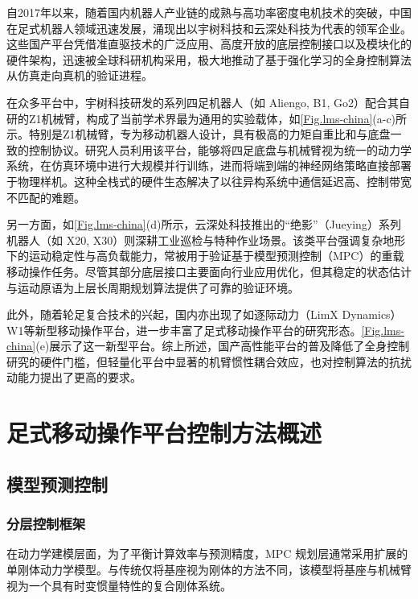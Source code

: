 自2017年以来，随着国内机器人产业链的成熟与高功率密度电机技术的突破，中国在足式机器人领域迅速发展，涌现出以宇树科技和云深处科技为代表的领军企业。这些国产平台凭借准直驱技术的广泛应用、高度开放的底层控制接口以及模块化的硬件架构，迅速被全球科研机构采用，极大地推动了基于强化学习的全身控制算法从仿真走向真机的验证进程。

在众多平台中，宇树科技研发的系列四足机器人（如 Aliengo, B1, Go2）配合其自研的Z1机械臂，构成了当前学术界最为通用的实验载体，如\autoref{Fig.lms-china}(a-c)所示。特别是Z1机械臂，专为移动机器人设计，具有极高的力矩自重比和与底盘一致的控制协议。研究人员利用该平台，能够将四足底盘与机械臂视为统一的动力学系统，在仿真环境中进行大规模并行训练，进而将端到端的神经网络策略直接部署于物理样机\cite{fu2022coupling, ji2022concurrent}。这种全栈式的硬件生态解决了以往异构系统中通信延迟高、控制带宽不匹配的难题。

另一方面，如\autoref{Fig.lms-china}(d)所示，云深处科技推出的“绝影”（Jueying）系列机器人（如 X20, X30）则深耕工业巡检与特种作业场景。该类平台强调复杂地形下的运动稳定性与高负载能力，常被用于验证基于模型预测控制（MPC）的重载移动操作任务。尽管其部分底层接口主要面向行业应用优化，但其稳定的状态估计与运动原语为上层长周期规划算法提供了可靠的验证环境\cite{wang2021model}。

此外，随着轮足复合技术的兴起，国内亦出现了如逐际动力（LimX Dynamics）W1等新型移动操作平台\cite{Jiang_2025}，进一步丰富了足式移动操作平台的研究形态。\autoref{Fig.lms-china}(e)展示了这一新型平台。综上所述，国产高性能平台的普及降低了全身控制研究的硬件门槛，但轻量化平台中显著的机臂惯性耦合效应，也对控制算法的抗扰动能力提出了更高的要求。

\section{足式移动操作平台控制方法概述}

\subsection{模型预测控制}

\subsubsection{分层控制框架}
在动力学建模层面，为了平衡计算效率与预测精度，MPC 规划层通常采用扩展的单刚体动力学模型。与传统仅将基座视为刚体的方法不同，该模型将基座与机械臂视为一个具有时变惯量特性的复合刚体系统。

